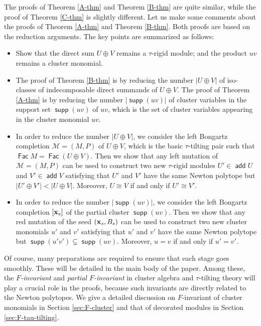 \documentclass[10pt]{amsart}
\theoremstyle{definition}
\theoremstyle{remark}
\numberwithin{equation}{section}
\newcommand{\opname}[1]{\operatorname{\mathsf{#1}}}
\newcommand{\Fac}{\opname{Fac}}
\newcommand{\supp}{\opname{supp}}
\newcommand{\add}{\opname{add}\nolimits}
\begin{document}
The proofs of Theorem \ref{A-thm} and Theorem \ref{B-thm} are quite similar, while the proof of Theorem \ref{C-thm} is slightly different. Let us make some comments about the proofs of Theorem \ref{A-thm} and Theorem \ref{B-thm}.  Both proofs are based on the reduction arguments.
The key points are summarized as follows:
\begin{itemize}
    \item [(i)] Show that the direct sum $U\oplus V$ remains a $\tau$-rigid module; and the product $uv$ remains a cluster monomial.
    \item[(ii)] 
The proof of Theorem \ref{B-thm} is
by reducing the number $|U\oplus V|$ of iso-classes of indecomposable direct summands of $U\oplus V$. The proof of Theorem \ref{A-thm} is by reducing the number $|\supp(uv)|$ of cluster variables in the support set $\supp(uv)$ of $uv$, which is the set of cluster variables appearing in the cluster monomial $uv$.
\item[(iii)] In order to reduce the number $|U\oplus V|$, we consider the left Bongartz completion $\mathcal M=(M,P)$ of $U\oplus V$, which is the basic $\tau$-tilting pair such that $\Fac M=\Fac (U\oplus V)$. Then we show that any left mutation of $\mathcal M=(M,P)$ can be used to construct two new $\tau$-rigid modules $U'\in \add U $ and $V'\in \add V$ satisfying that  $U'$ and $V'$ have the same Newton polytope but $|U'\oplus V'|<|U\oplus V|$. Moreover, $U\cong V$ if and only if $U'\cong V'$.


\item[(iv)] In order to reduce the number $|\supp(uv)|$, we consider the left Bongartz completion $[{\bf x}_s]$ of the partial cluster $\supp(uv)$. Then we show that any red mutation of the seed $({\bf x}_s, B_s)$ can be used to construct two new cluster monomials $u'$ and $v'$ satisfying that $u'$ and $v'$ have the same Newton polytope but $\supp(u'v')\subsetneq \supp(uv)$. Moreover, $u=v$ if and only if $u'=v'$. 
\end{itemize}
 

Of course, many preparations are required to ensure that each stage goes smoothly. These will be detailed in the main body of the paper. Among these, the {\em $F$-invariant} and {\em partial $F$-invariant} in cluster algebra and $\tau$-tilting theory will play a crucial role in the proofs, because such invariants are directly related to the Newton polytopes. We give a detailed discussion on $F$-invariant of cluster monomials in Section \ref{sec:F-cluster} and  that of decorated modules in Section \ref{sec:F-tau-tilting}.
\end{document}
